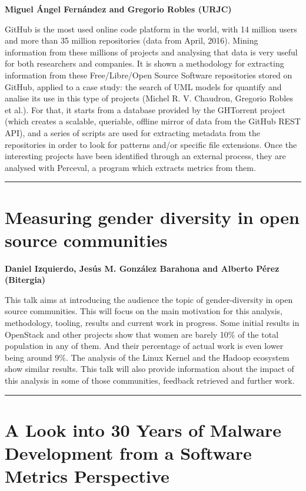 \documentclass[11pt,pressrelease]{newlfm} %
\begin{document}
\begin{newlfm}
{\bf Miguel \'Angel Fern\'andez and Gregorio Robles (URJC)}

GitHub is the most used online code platform in the world, with 14 million users and more than 35 million repositories (data from April, 2016). Mining information from these millions of projects and analysing that data is very useful for both researchers and companies. It is shown a methodology for extracting information from these Free/Libre/Open Source Software repositories stored on GitHub, applied to a case study: the search of UML models for quantify and analise its use in this type of projects (Michel R. V. Chaudron, Gregorio Robles et al.). For that, it starts from a database provided by the GHTorrent project (which creates a scalable, queriable, offline mirror of data from the GitHub REST API), and a series of scripts are used for extracting metadata from the repositories in order to look for patterns and/or specific file extensions. Once the interesting projects have been identified through an external process, they are analysed with Perceval, a program which extracts metrics from them.

\rule{\textwidth}{1pt} \par \noindent
\section{Measuring gender diversity in open source communities}

{\bf Daniel Izquierdo, Jes\'us M. Gonz\'alez Barahona and Alberto P\'erez (Bitergia)}

This talk aims at introducing the audience the topic of gender-diversity in open source communities. This will focus on the main motivation for this analysis, methodology, tooling, results and current work in progress. Some initial results in OpenStack and other projects show that women are barely 10\% of the total population in any of them. And their percentage of actual work is even lower being around 9\%. The analysis of the Linux Kernel and the Hadoop ecosystem show similar results. This talk will also provide information about the impact of this analysis in some of those communities, feedback retrieved and further work.

\rule{\textwidth}{1pt} \par \noindent
\section{A Look into 30 Years of Malware Development from a Software Metrics Perspective}


\end{newlfm}
\end{document}
